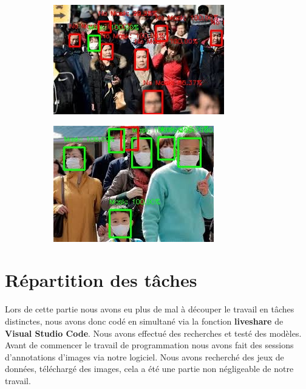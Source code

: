 \begin{figure}[H]
  \begin{subfigure}[b]{0.4\linewidth}
    \includegraphics[width=\linewidth]{resources/images359-223.jpg}
  \end{subfigure}
  \label{fig:coffee}
   \begin{subfigure}[b]{0.35\linewidth}
    \includegraphics[width=\linewidth]{resources/images435-291.jpg}
  \end{subfigure}
\end{figure}


\section{Répartition des tâches}

Lors de cette partie nous avons eu plus de mal à découper le travail en tâches distinctes, nous avons donc codé en simultané via la fonction \textbf{liveshare} de \textbf{Visual Studio Code}. Nous avons effectué des recherches et testé des modèles. 
Avant de commencer le travail de programmation nous avons fait des sessions d'annotations d'images via notre logiciel.
Nous avons recherché des jeux de données, téléchargé des images, cela a été une partie non négligeable de notre travail.


